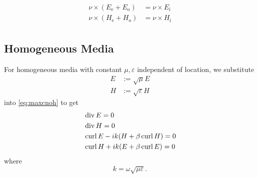 \begin{equation}
\begin{split}
  \nu\times\left(E_\text{e} + E_\text{o}\right) &= \nu\times E_\text{i} \\
  \nu\times\left(H_\text{e} + H_\text{o}\right) &= \nu\times H_\text{i} \\
\end{split}
\end{equation}

\subsection{Homogeneous Media}

For homogeneous media with constant $\mu,\varepsilon$ independent of location, we substitute
\begin{equation}\label{eq:scale}
  \begin{split}
    E &:= \sqrt{\mu}E \\
    H &:= \sqrt{\varepsilon}H 
  \end{split}
\end{equation} 
into \eqref{eq:maxcnoh} to get
\begin{equation}\label{eq:maxch}
\begin{split}
  &\operatorname{div} E = 0 \\
  &\operatorname{div} H = 0 \\
  &\operatorname{curl} E - ik(H+\beta\operatorname{curl} H) = 0\\
  &\operatorname{curl} H + ik(E+\beta\operatorname{curl} E) = 0
\end{split}
\end{equation}
where
$$k=\omega\sqrt{\mu\varepsilon}.$$ 

